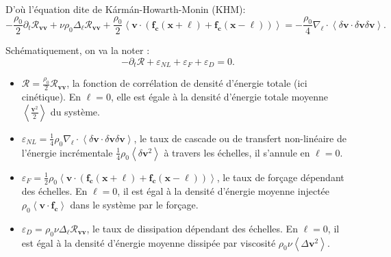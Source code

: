 D'où l'équation dite de K\'arm\'an-Howarth-Monin (\acs{KHM}): 
\begin{equation}
    - \frac{\rho_0}{2} \partial_t \mathcal{R}_{\boldsymbol{v}\boldsymbol{v}} + \nu \rho_0 \Delta_{\boldsymbol{\ell}} \mathcal{R}_{\boldsymbol{v}\boldsymbol{v}} + \frac{\rho_0}{2} \left<\boldsymbol{v} \cdot \left(\boldsymbol{f_c}\left(\mathbf{x}+\boldsymbol{\ell}\right) +  \boldsymbol{f_c}\left(\mathbf{x}-\boldsymbol{\ell}\right)\right)\right> = - \frac{\rho_0}{4} \nabla_{\boldsymbol{\ell}} \cdot \left<\delta \boldsymbol{v} \cdot \delta \boldsymbol{v} \delta \boldsymbol{v}\right> \label{eq:KHM_HD}  
.\end{equation} 

Schématiquement, on va la noter : 
\begin{equation}
    \label{eq:bal_KHM} -\partial_t \mathcal{R} + \varepsilon_{NL} + \varepsilon_{F} + \varepsilon_{D} = 0 .
\end{equation} 
\begin{itemize}
    \item $\mathcal{R} = \frac{\rho_0}{2} \mathcal{R}_{\boldsymbol{v}\boldsymbol{v}}$, la fonction de corrélation de densité d'énergie totale (ici cinétique). En $\boldsymbol{\ell} = 0$, elle est égale à la densité d'énergie totale moyenne $\left<\frac{\boldsymbol{v}^2}{2}\right>$ du système.
    \item $\varepsilon_{NL} = \frac{1}{4} \rho_0 \nabla_{\boldsymbol{\ell}} \cdot \left<\delta \boldsymbol{v} \cdot \delta \boldsymbol{v} \delta \boldsymbol{v}\right>$, le taux de cascade ou de transfert non-linéaire de l'énergie incrémentale $\frac{1}{4} \rho_0 \left<\delta \boldsymbol{v}^2\right>$ à travers les échelles, il s'annule en $\boldsymbol{\ell} = 0$.
    \item $\varepsilon_{F} = \frac{1}{2} \rho_0 \left<\boldsymbol{v} \cdot \left(\boldsymbol{f_c}\left(\mathbf{x}+\boldsymbol{\ell}\right) +  \boldsymbol{f_c}\left(\mathbf{x}-\boldsymbol{\ell}\right)\right)\right>$, le taux de forçage dépendant des échelles. En $\boldsymbol{\ell} = 0$, il est égal à la densité d'énergie moyenne injectée $\rho_0 \left<\boldsymbol{v} \cdot  \boldsymbol{f_c}\right>$ dans le système par le forçage.
    \item $\varepsilon_{D} = \rho_0 \nu \Delta_{\boldsymbol{\ell}} \mathcal{R}_{\boldsymbol{v}\boldsymbol{v}}$, le taux de dissipation dépendant des échelles. En $\boldsymbol{\ell} = 0$, il est égal à la densité d'énergie moyenne dissipée par viscosité $\rho_0 \nu \left<\Delta \boldsymbol{v}^2\right>$.
\end{itemize}

